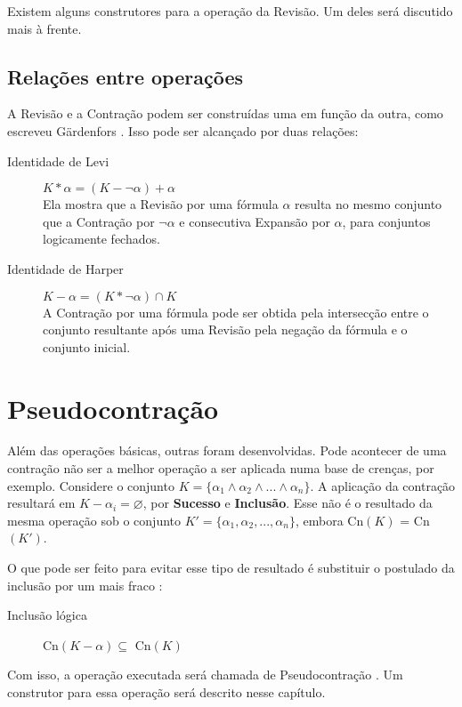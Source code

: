 Existem alguns construtores para a operação da Revisão. Um deles será discutido mais à frente.

\subsection{Relações entre operações}

A Revisão e a Contração podem ser construídas uma em função da outra, como escreveu Gärdenfors \citep{revisaoGardenfors}. Isso pode ser alcançado por duas relações:

\begin{description}
	\item[Identidade de Levi] $ K \ast \alpha = (K - \lnot \alpha) + \alpha $ \\ Ela mostra que a Revisão por uma fórmula $ \alpha $ resulta no mesmo conjunto que a Con\-tra\-ção por $ \lnot \alpha $ e consecutiva Expansão por $ \alpha $, para conjuntos logicamente fechados.
	\item[Identidade de Harper] $ K - \alpha = (K \ast \lnot \alpha) \cap K $ \\ A Contração por uma fórmula pode ser obtida pela intersecção entre o conjunto resultante após uma Revisão pela negação da fórmula e o conjunto inicial.
\end{description}

\section{Pseudocontração}

Além das operações básicas, outras foram desenvolvidas. Pode acontecer de uma contração não ser a melhor operação a ser aplicada numa base de crenças, por exemplo. Considere o conjunto $ K = \{\alpha_1 \land \alpha_2 \land ... \land \alpha_n\} $. A aplicação da contração resultará em $ K - \alpha_i = \varnothing $, por \textbf{Sucesso} e \textbf{Inclusão}. Esse não é o resultado da mesma operação sob o conjunto $ K' = \{\alpha_1, \alpha_2, ..., \alpha_n\} $, embora Cn$(K)$ = Cn$(K')$.

O que pode ser feito para evitar esse tipo de resultado é substituir o postulado da inclusão por um mais fraco \citep{revisaoHansson3}:

\begin{description}
	\item[Inclusão lógica] Cn$(K - \alpha) \subseteq $ Cn$(K)$ 
\end{description}

Com isso, a operação executada será chamada de Pseudocontração \citep{revisaoHansson4}. Um construtor para essa operação será descrito nesse capítulo.

